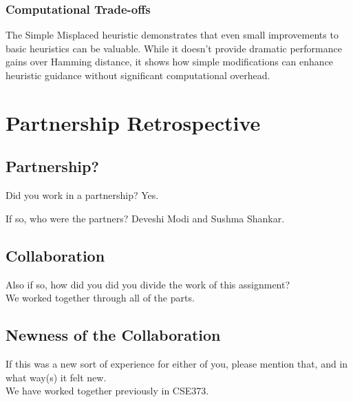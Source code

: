 \documentclass{article}
\begin{document}
\subsubsection{Computational Trade-offs}
The Simple Misplaced heuristic demonstrates that even small improvements to basic heuristics can be valuable. While it doesn't provide dramatic performance gains over Hamming distance, it shows how simple modifications can enhance heuristic guidance without significant computational overhead.

\newpage
\section{Partnership Retrospective}

\subsection{Partnership?}
Did you work in a partnership? Yes.

If so, who were the partners? Deveshi Modi and Sushma Shankar.
\subsection{Collaboration}
Also if so, how did you did you divide the work of this assignment?\\
We worked together through all of the parts.
\subsection{Newness of the Collaboration}
If this was a new sort of experience for either of you, please mention that,
and in what way(s) it felt new. \\
We have worked together previously in CSE373.
\end{document}
